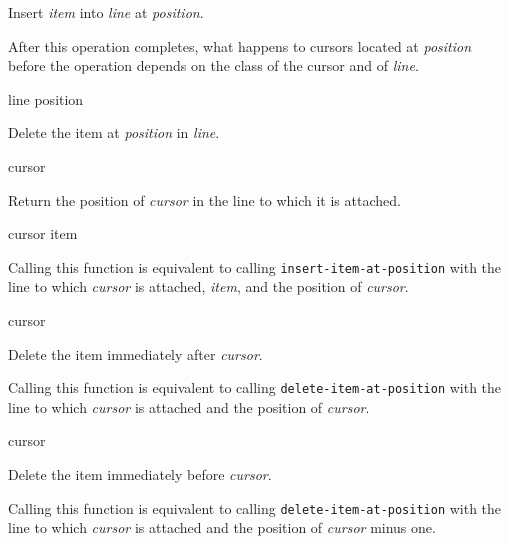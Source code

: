 Insert \textit{item} into \textit{line} at \textit{position}.

After this operation completes, what happens to cursors located at
\textit{position} before the operation depends on the class of the
cursor and of \textit{line}.

 {line position}

Delete the item at \textit{position} in \textit{line}.

 {cursor}

Return the position of \textit{cursor} in the line to which it is
attached.

 {cursor item}

Calling this function is equivalent to calling
\texttt{insert-item-at-position} with the line to which
\textit{cursor} is attached, \textit{item}, and the position of
\textit{cursor}.

 {cursor}

Delete the item immediately after \emph{cursor}.

Calling this function is equivalent to calling
\texttt{delete-item-at-position} with the line to which
\textit{cursor} is attached and the position of \textit{cursor}.

 {cursor}

Delete the item immediately before \emph{cursor}.

Calling this function is equivalent to calling
\texttt{delete-item-at-position} with the line to which
\textit{cursor} is attached and the position of \textit{cursor} minus
one.

